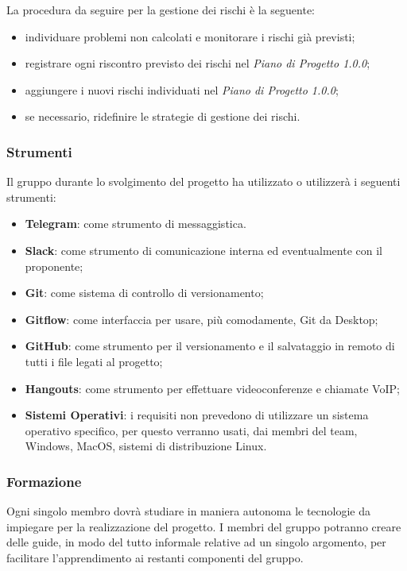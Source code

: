    				La procedura da seguire per la gestione dei rischi è la seguente:
   				\begin{itemize}
   					\item individuare problemi non calcolati e monitorare i rischi già previsti;
   					\item registrare ogni riscontro previsto dei rischi nel \textit{Piano di Progetto 1.0.0\docs};
   					\item aggiungere i nuovi rischi individuati nel \textit{Piano di Progetto 1.0.0\docs};
   					\item  se necessario, ridefinire le strategie di gestione dei rischi.
   				\end{itemize}
   		\subsubsection{Strumenti}
   			Il gruppo durante lo svolgimento del progetto ha utilizzato o utilizzerà i seguenti strumenti:
   			\begin{itemize}
   				\item \textbf{Telegram}: come strumento di messaggistica.
   				\item \textbf{Slack}: come strumento di comunicazione interna ed eventualmente con il proponente;
   				\item \textbf{Git}: come sistema di controllo di versionamento;
   				\item \textbf{Gitflow}: come interfaccia per usare, più comodamente, Git da Desktop;
   				\item \textbf{GitHub}: come strumento per il versionamento e il salvataggio in remoto di tutti i file legati al progetto;
   				\item \textbf{Hangouts}: come strumento per effettuare videoconferenze e chiamate VoIP;
   				\item \textbf{Sistemi Operativi}: i requisiti non prevedono di utilizzare un sistema operativo specifico, per questo verranno usati, dai membri del team, Windows, MacOS, sistemi di distribuzione Linux.
   			\end{itemize}
   		\subsubsection{Formazione}
   			Ogni singolo membro dovrà studiare in maniera autonoma le tecnologie da impiegare per la realizzazione del progetto. I membri del gruppo potranno creare delle guide, in modo del tutto informale relative ad un singolo argomento, per facilitare l'apprendimento ai restanti componenti del gruppo.


